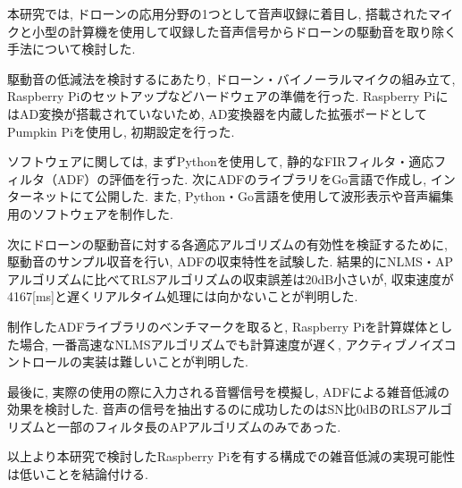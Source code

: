 \begin{jabstract}
本研究では, ドローンの応用分野の1つとして音声収録に着目し, 搭載されたマイクと小型の計算機を使用して収録した音声信号からドローンの駆動音を取り除く手法について検討した. 

駆動音の低減法を検討するにあたり, ドローン・バイノーラルマイクの組み立て, Raspberry
Piのセットアップなどハードウェアの準備を行った.  Raspberry
PiにはAD変換が搭載されていないため, AD変換器を内蔵した拡張ボードとしてPumpkin
Piを使用し, 初期設定を行った. 

ソフトウェアに関しては, まずPythonを使用して, 静的なFIRフィルタ・適応フィルタ（ADF）の評価を行った. 次にADFのライブラリをGo言語で作成し, インターネットにて公開した. また, Python・Go言語を使用して波形表示や音声編集用のソフトウェアを制作した. 

次にドローンの駆動音に対する各適応アルゴリズムの有効性を検証するために, 駆動音のサンプル収音を行い, ADFの収束特性を試験した. 結果的にNLMS・APアルゴリズムに比べてRLSアルゴリズムの収束誤差は20dB小さいが, 収束速度が4167[ms]と遅くリアルタイム処理には向かないことが判明した. 

制作したADFライブラリのベンチマークを取ると, Raspberry
Piを計算媒体とした場合, 一番高速なNLMSアルゴリズムでも計算速度が遅く, アクティブノイズコントロールの実装は難しいことが判明した. 

最後に, 実際の使用の際に入力される音響信号を模擬し, ADFによる雑音低減の効果を検討した. 音声の信号を抽出するのに成功したのはSN比0dBのRLSアルゴリズムと一部のフィルタ長のAPアルゴリズムのみであった. 

以上より本研究で検討したRaspberry Piを有する構成での雑音低減の実現可能性は低いことを結論付ける. 
\end{jabstract}
